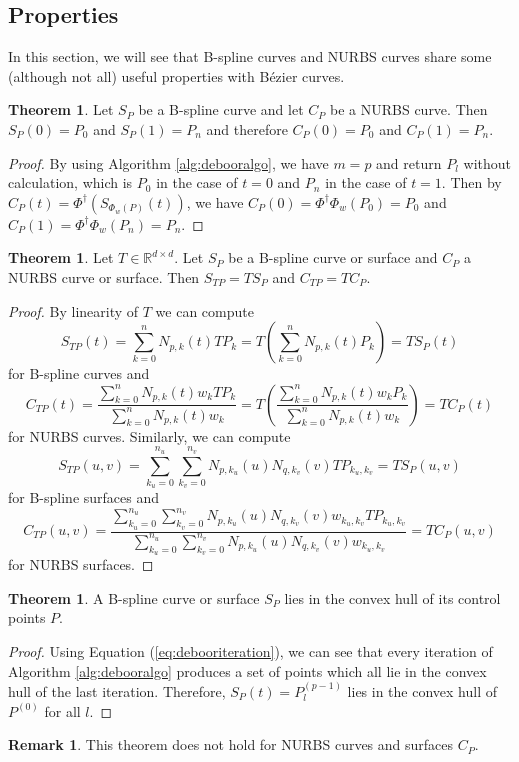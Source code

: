 \documentclass[a4paper, 11pt]{report}
\theoremstyle{definition}
\newtheorem{theorem}[definition]{Theorem}
\newtheorem*{remark}{Remark}
\begin{document}
\subsection{Properties}
	In this section, we will see that B-spline curves and NURBS curves share some (although not all) useful properties with Bézier curves.

	\begin{theorem}
		Let $S_P$ be a B-spline curve and let $C_P$ be a NURBS curve. Then $S_P(0) = P_0$ and $S_P(1) = P_n$ and therefore $C_P(0) = P_0$ and $C_P(1) = P_n$.
	\end{theorem}
	\begin{proof}
		By using Algorithm \ref{alg:debooralgo}, we have $m = p$ and return $P_l$ without calculation, which is $P_0$ in the case of $t = 0$ and $P_n$ in the case of $t = 1$. Then by $C_P(t) = \Phi^\dagger(S_{\Phi_w(P)}(t))$, we have $C_P(0) = \Phi^\dagger\Phi_w(P_0) = P_0$ and $C_P(1) = \Phi^\dagger\Phi_w(P_n) = P_n$.
	\end{proof}

	\begin{theorem}
		Let $T \in \mathbb{R}^{d \times d}$. Let $S_P$ be a B-spline curve or surface and $C_P$ a NURBS curve or surface. Then $S_{TP} = TS_P$ and $C_{TP} = TC_P$.
	\end{theorem}
	\begin{proof}
		By linearity of $T$ we can compute
			$$S_{TP}(t) = \sum_{k=0}^{n} N_{p,k}(t) TP_k = T \left( \sum_{k=0}^{n} N_{p,k}(t) P_k \right) = TS_P(t)$$
		for B-spline curves and
			$$C_{TP}(t) = \frac{\sum_{k=0}^n N_{p,k}(t) w_k TP_k}{\sum_{k=0}^n N_{p,k}(t) w_k} = T \left( \frac{\sum_{k=0}^n N_{p,k}(t) w_k P_k}{\sum_{k=0}^n N_{p,k}(t) w_k} \right) = TC_P(t)$$
		for NURBS curves.
		Similarly, we can compute
			$$ S_{TP}(u,v) = \sum_{k_u=0}^{n_u} \sum_{k_v=0}^{n_v} N_{p,k_u}(u) N_{q,k_v}(v) TP_{k_u,k_v} = TS_P(u,v)$$
		for B-spline surfaces and
			$$ C_{TP}(u,v) = \frac {\sum_{k_u=0}^{n_u} \sum_{k_v=0}^{n_v} N_{p,k_u}(u) N_{q,k_v}(v) w_{k_u, k_v} TP_{k_u,k_v}}{\sum_{k_u=0}^{n_u} \sum_{k_v=0}^{n_v} N_{p,k_u}(u) N_{q,k_v}(v) w_{k_u, k_v}} = TC_P(u,v) $$
		for NURBS surfaces.
	\end{proof}

	\begin{theorem}
		A B-spline curve or surface $S_P$ lies in the convex hull of its control points $P$.
	\end{theorem}
	\begin{proof}
		Using Equation (\ref{eq:debooriteration}), we can see that every iteration of Algorithm \ref{alg:debooralgo} produces a set of points which all lie in the convex hull of the last iteration. Therefore, $S_P(t) = P^{(p-1)}_l$ lies in the convex hull of $P^{(0)}$ for all $l$.
	\end{proof}
	\begin{remark}
		This theorem does not hold for NURBS curves and surfaces $C_P$.
	\end{remark}
\end{document}
